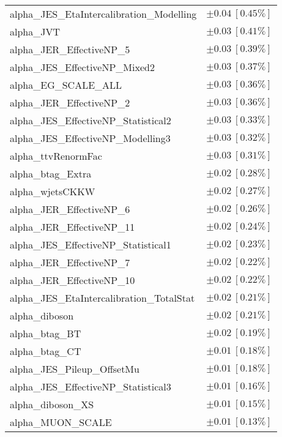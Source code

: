 \begin{table}
\begin{center}
\begin{tabular*}{\textwidth}{@{\extracolsep{\fill}}lc}
alpha\_JES\_EtaIntercalibration\_Modelling         & $\pm 0.04\ [0.45\%] $       \\
alpha\_JVT         & $\pm 0.03\ [0.41\%] $       \\
alpha\_JER\_EffectiveNP\_5         & $\pm 0.03\ [0.39\%] $       \\
alpha\_JES\_EffectiveNP\_Mixed2         & $\pm 0.03\ [0.37\%] $       \\
alpha\_EG\_SCALE\_ALL         & $\pm 0.03\ [0.36\%] $       \\
alpha\_JER\_EffectiveNP\_2         & $\pm 0.03\ [0.36\%] $       \\
alpha\_JES\_EffectiveNP\_Statistical2         & $\pm 0.03\ [0.33\%] $       \\
alpha\_JES\_EffectiveNP\_Modelling3         & $\pm 0.03\ [0.32\%] $       \\
alpha\_ttvRenormFac         & $\pm 0.03\ [0.31\%] $       \\
alpha\_btag\_Extra         & $\pm 0.02\ [0.28\%] $       \\
alpha\_wjetsCKKW         & $\pm 0.02\ [0.27\%] $       \\
alpha\_JER\_EffectiveNP\_6         & $\pm 0.02\ [0.26\%] $       \\
alpha\_JER\_EffectiveNP\_11         & $\pm 0.02\ [0.24\%] $       \\
alpha\_JES\_EffectiveNP\_Statistical1         & $\pm 0.02\ [0.23\%] $       \\
alpha\_JER\_EffectiveNP\_7         & $\pm 0.02\ [0.22\%] $       \\
alpha\_JER\_EffectiveNP\_10         & $\pm 0.02\ [0.22\%] $       \\
alpha\_JES\_EtaIntercalibration\_TotalStat         & $\pm 0.02\ [0.21\%] $       \\
alpha\_diboson         & $\pm 0.02\ [0.21\%] $       \\
alpha\_btag\_BT         & $\pm 0.02\ [0.19\%] $       \\
alpha\_btag\_CT         & $\pm 0.01\ [0.18\%] $       \\
alpha\_JES\_Pileup\_OffsetMu         & $\pm 0.01\ [0.18\%] $       \\
alpha\_JES\_EffectiveNP\_Statistical3         & $\pm 0.01\ [0.16\%] $       \\
alpha\_diboson\_XS         & $\pm 0.01\ [0.15\%] $       \\
alpha\_MUON\_SCALE         & $\pm 0.01\ [0.13\%] $       \\

\end{tabular*}
\end{center}
\end{table}

